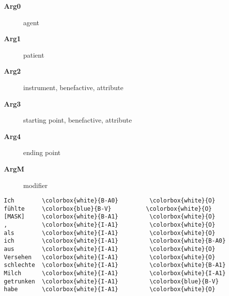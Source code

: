 \begin{description}
  \item[\textbf{Arg0}] agent
  \item[\textbf{Arg1}] patient
  \item[\textbf{Arg2}] instrument, benefactive, attribute
  \item[\textbf{Arg3}] starting point, benefactive, attribute
  \item[\textbf{Arg4}] ending point
  \item[\textbf{ArgM}] modifier
\end{description}


\begin{Verbatim}[commandchars=\\\{\}]
Ich        \colorbox{white}{B-A0}         \colorbox{white}{O}
fühlte     \colorbox{blue}{B-V}          \colorbox{white}{O}
[MASK]     \colorbox{white}{B-A1}         \colorbox{white}{O}
,          \colorbox{white}{I-A1}         \colorbox{white}{O}
als        \colorbox{white}{I-A1}         \colorbox{white}{O}
ich        \colorbox{white}{I-A1}         \colorbox{white}{B-A0}
aus        \colorbox{white}{I-A1}         \colorbox{white}{O}
Versehen   \colorbox{white}{I-A1}         \colorbox{white}{O}
schlechte  \colorbox{white}{I-A1}         \colorbox{white}{B-A1}
Milch      \colorbox{white}{I-A1}         \colorbox{white}{I-A1}
getrunken  \colorbox{white}{I-A1}         \colorbox{blue}{B-V}
habe       \colorbox{white}{I-A1}         \colorbox{white}{O}
\end{Verbatim}



